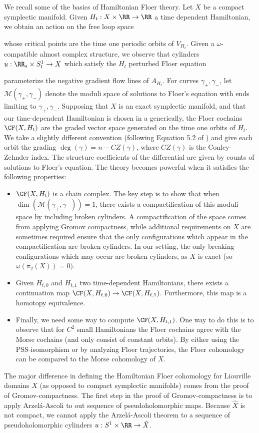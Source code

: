 We recall some of the basics of Hamiltonian Floer theory. Let $X$ be a compact symplectic manifold. 
Given $H_t: X\times \RR\to \RR$ a time dependent Hamiltonian, we obtain an action on the free loop space

whose critical points are the time one periodic orbits of $V_{H_t}$. Given a $\omega$-compatible almost complex structure, we observe that cylinders $u: \RR_s\times S^1_t\to X$ which satisfy the $H_t$ perturbed Floer equation

parameterize the negative gradient flow lines of $A_{H_t}$. For curves $\gamma_+, \gamma_-$, let $\mathcal M(\gamma_+, \gamma_-)$ denote the moduli space of solutions to Floer's equation with ends limiting to $\gamma_+, \gamma_-$.
Supposing that $X$ is an exact symplectic manifold, and that our time-dependent Hamiltonian is chosen in a generically, the Floer cochains $\CF(X, H_t)$ are the graded vector space generated  on the time one orbits of $H_t$.
We take a slightly different convention (following Equation 5.2 of \cite{abouzaid2010geometric}) and give each orbit the grading $\deg(\gamma)=n-CZ(\gamma)$, where $CZ(\gamma)$ is the Conley-Zehnder index.
The structure coefficients of the differential are given by counts of solutions to Floer's equation. The theory becomes powerful when it satisfies the following properties:
\begin{itemize}
    \item $\CF(X, H_t)$ is a chain complex. The key step is to show that when $\dim(\mathcal M(\gamma_+, \gamma_-))=1$, there exists a compactification of this moduli space by including broken cylinders. A compactification of the space comes from applying Gromov compactness, while additional requirements on $X$ are sometimes required ensure that the only configurations which appear in the compactification are broken cylinders. In our setting, the only breaking configurations which may occur are broken cylinders, as $X$ is exact (so $\omega(\pi_2(X))=0)$.
    \item Given $H_{t, 0}$ and $H_{t, 1}$ two time-dependent Hamiltonians, there exists a continuation map $\CF(X, H_{t, 0})\to \CF(X, H_{t, 1})$. Furthermore, this map is a homotopy equivalence. 
    \item Finally, we need some way to compute $\CF(X, H_{t, 1})$. One way to do this is to observe that for $C^2$ small Hamiltonians the Floer cochains agree with the Morse cochains (and only consist of constant orbits). By either using the PSS-isomorphism or by analyzing Floer trajectories, the Floer cohomology can be compared to the Morse cohomology of $X$.
\end{itemize}
The major difference in defining the Hamiltonian Floer cohomology for Liouville domains $X$ (as opposed to compact symplectic manifolds) comes from the proof of Gromov-compactness. The first step in the proof of Gromov-compactness is to apply Arzel\'a-Ascoli to out sequence of pseudoholomorphic maps.  Because $\hat X$ is not compact, we cannot apply the Arzel\'a-Ascoli theorem to a sequence of pseudoholomorphic cylinders $u: S^1\times \RR \to \hat X$. 


